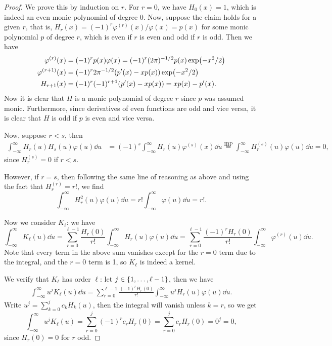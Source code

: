 \documentclass{article}
\theoremstyle{plain}
\theoremstyle{remark}
\renewcommand{\phi}{\varphi}
\begin{document}
\begin{proof}
 	We prove this by induction on $r$. For $r = 0$, we have $H_0(x) = 1$, which is indeed an even monic polynomial of degree 0. 
 	Now, suppose the claim holds for a given $r$, that is, $H_r(x) = (-1)^r \phi^{(r)}(x)/\phi(x) = p(x)$ for some monic polynomial $p$ of degree $r$, which is even if $r$ is even and odd if $r$ is odd. Then we have
 	\begin{align*}
 	\phi^{(r)}(x) &= (-1)^r p(x) \phi(x) = (-1)^r (2\pi)^{-1/2} p(x) \exp(-x^2/2) \\
 	\phi^{(r+1)}(x) &= (-1)^r 2\pi^{-1/2} \qty(p'(x) - x p(x)) \exp(-x^2/2) \\
 	H_{r+1 }(x) &= (-1)^r (-1)^{r+1} \qty(p'(x) - x p(x)) = xp(x) - p'(x). 
 	\end{align*}
 	Now it is clear that $H$ is a monic polynomial of degree $r$ since $p$ was assumed monic. Furthermore, since derivatives of even functions are odd and vice versa, it is clear that $H$ is odd if $p$ is even and vice versa. 

	Now, suppose $r < s$, then 
	\begin{align*}
		\int_{-\infty}^\infty H_r(u) H_s(u) \phi(u) \dd{u} &= (-1)^s \int_{-\infty}^\infty H_r(u) \phi^{(s)}(x) \dd{u} \overset{\text{IBP}}= \int_{-\infty}^\infty H_r^{(s)}(u) \phi(u) \dd{u} = 0,
	\end{align*}
since $H_r^{(s)} = 0$ if $r < s$. 

However, if $r = s$, then following the same line of reasoning as above and using the fact that $H_r^{(r)} = r!$, we find
\[
\int_{-\infty}^\infty H_r^2(u) \phi(u) \dd{u} = r! \int_{-\infty}^\infty \phi(u) \dd{u} = r!. 
\]

Now we consider $K_\ell$: we have
\[
\int_{-\infty}^\infty K_\ell(u) \dd{u} = \sum_{r=0}^{\ell - 1} \frac{H_r(0)}{r!} \int_{-\infty}^\infty H_r(u) \phi(u) \dd{u} =  \sum_{r=0}^{\ell - 1} \frac{(-1)^r H_r(0)}{r!} \int_{-\infty}^\infty \phi^{(r)}(u) \dd{u}.
\]
Note that every term in the above sum vanishes except for the $r = 0$ term due to the integral, and the $r = 0$ term is 1, so $K_\ell$ is indeed a kernel. 

We verify that $K_\ell$ has order $\ell$: let $j \in \qty{1, \dotsc, \ell - 1}$, then we have
\begin{align*}
	\int_{-\infty}^\infty u^j K_\ell(u) \dd{u} = \sum_{r=0}^{\ell - 1} \frac{(-1)^r H_r(0)}{r!} \int_{-\infty}^\infty u^j H_r(u) \phi(u) \dd{u}.
\end{align*}
Write $u^j = \sum_{k=0}^j c_k H_k(u)$, then the integral will vanish unless $k = r$, so we get
\[
\int_{-\infty}^\infty u^j K_\ell(u) = \sum_{r=0}^{j} (-1)^r c_r H_r(0) = \sum_{r=0}^j c_r H_r(0) = 0^j = 0,
\]
since $H_r(0) = 0$ for $r$ odd. 
%
\end{proof}
\end{document}
